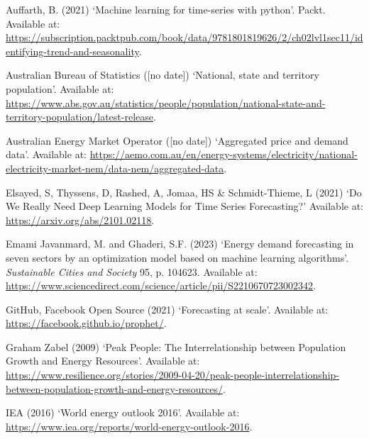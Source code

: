 \documentclass[mstat,12pt]{unswthesis}
\begin{document}
\hypertarget{refs}{}
\begin{CSLReferences}{0}{0}
\leavevmode{}%
Auffarth, B. (2021) {`Machine learning for time-series with python'}.
Packt. Available at:
\url{https://subscription.packtpub.com/book/data/9781801819626/2/ch02lvl1sec11/identifying-trend-and-seasonality}.

\leavevmode{}%
Australian Bureau of Statistics ({[}no date{]}) {`National, state and
territory population'}. Available at:
\url{https://www.abs.gov.au/statistics/people/population/national-state-and-territory-population/latest-release}.

\leavevmode{}%
Australian Energy Market Operator ({[}no date{]}) {`Aggregated price and
demand data'}. Available at:
\url{https://aemo.com.au/en/energy-systems/electricity/national-electricity-market-nem/data-nem/aggregated-data}.

\leavevmode{}%
Elsayed, S, Thyssens, D, Rashed, A, Jomaa, HS \& Schmidt-Thieme, L
(2021) {`{Do We Really Need Deep Learning Models for Time Series
Forecasting?}'} Available at: \url{https://arxiv.org/abs/2101.02118}.

\leavevmode{}%
Emami Javanmard, M. and Ghaderi, S.F. (2023) {`Energy demand forecasting
in seven sectors by an optimization model based on machine learning
algorithms'}. \emph{Sustainable Cities and Society} 95, p. 104623.
Available at:
\url{https://www.sciencedirect.com/science/article/pii/S2210670723002342}.

\leavevmode{}%
GitHub, Facebook Open Source (2021) {`{Forecasting at scale}'}.
Available at: \url{https://facebook.github.io/prophet/}.

\leavevmode{}%
Graham Zabel (2009) {`{Peak People: The Interrelationship between
Population Growth and Energy Resources}'}. Available at:
\url{https://www.resilience.org/stories/2009-04-20/peak-people-interrelationship-between-population-growth-and-energy-resources/}.

\leavevmode{}%
IEA (2016) {`World energy outlook 2016'}. Available at:
\url{https://www.iea.org/reports/world-energy-outlook-2016}.


\end{CSLReferences}
\end{document}
